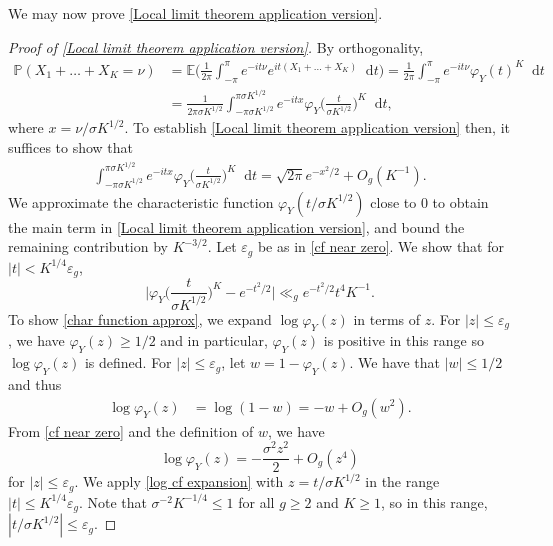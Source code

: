\documentclass[hidelinks,11pt,reqno]{amsart}
\renewcommand{\leq}{\leqslant}
\renewcommand{\geq}{\geqslant}
\newcommand{\E}{\ensuremath{\mathbb{E}}}
\newcommand{\prob}{\ensuremath{\mathbb{P}}}
\newcommand*\dif{\mathop{}\!\mathrm{d}}
\newcommand{\cf}{\varphi_{Y}}
\theoremstyle{remark}
\begin{document}
    We may now prove \cref{Local limit theorem application version}.
   \begin{proof}[Proof of \cref{Local limit theorem application version}]
    By orthogonality, 
      \begin{align}  \prob(X_{1}+\ldots+X_{K}=\nu)&=\E\Big(\frac{1}{2\pi}\int_{-\pi}^{\pi}e^{-it\nu}e^{it(X_{1}+\ldots+X_{K})}\dif t\Big)=\frac{1}{2\pi}\int_{-\pi}^{\pi}e^{-it\nu}\cf(t)^{K}\dif t\nonumber\\ 
        &=\frac{1}{2\pi\sigma K^{1/2}}\int_{-\pi\sigma K^{1/2}}^{\pi\sigma K^{1/2}}e^{-itx}\cf\Big(\frac{t}{\sigma K^{1/2}}\Big)^{K}\dif t,\label{cf integral}
    \end{align}
    where $x=\nu/\sigma K^{1/2}$. To establish \cref{Local limit theorem application version} then, it suffices to show that
    \begin{align}\label{int for llt to show}
        \int_{-\pi\sigma K^{1/2}}^{\pi\sigma K^{1/2}}e^{-itx}\cf\Big(\frac{t}{\sigma K^{1/2}}\Big)^{K}\dif t=\sqrt{2\pi}e^{-x^{2}/2}+O_{g}(K^{-1}).
    \end{align}    
    We approximate the characteristic function $\cf(t/\sigma K^{1/2})$ close to 0 to obtain the main term in \cref{Local limit theorem application version}, and bound the remaining contribution by $K^{-3/2}$. Let $\varepsilon_{g}$ be as in \cref{cf near zero}. We show that for $|t|< K^{1/4}\varepsilon_{g}$, 
    \begin{equation}\label{char function approx}
        \Big |\cf\Big(\frac{t}{\sigma K^{1/2}}\Big)^{K}-e^{-t^{2}/2} \Big |\ll_{g} e^{-t^{2}/2}t^{4}K^{-1}.
    \end{equation}
    To show \cref{char function approx}, we expand $\log \cf(z)$ in terms of $z$. For $|z|\leq \varepsilon_{g}$, we have $\varphi_{Y}(z)\geq 1/2$ and in particular, $\cf(z)$ is positive in this range so $\log \cf(z)$ is defined. For $|z|\leq \varepsilon_{g}$, let $w=1-\cf(z)$. We have that $|w|\leq 1/2$ and thus
    \begin{align*}
        \log \cf(z)&=\log (1-w)=-w+O_{g}(w^{2}).
    \end{align*}
From \cref{cf near zero} and the definition of $w$, we have
    \begin{equation}\label{log cf expansion}
        \log \cf(z)=-\frac{\sigma^{2}z^{2}}{2}+O_{g}(z^{4})
    \end{equation}
    for $|z|\leq \varepsilon_{g}$. We apply \cref{log cf expansion} with $z=t/\sigma K^{1/2}$ in the range $|t|\leq K^{1/4}\varepsilon_{g}$. Note that $\sigma^{-2}K^{-1/4}\leq 1$ for all $g\geq 2$ and $K\geq 1$, so in this range, $|t/\sigma K^{1/2}|\leq \varepsilon_{g}$.
       

\end{proof}
\end{document}

